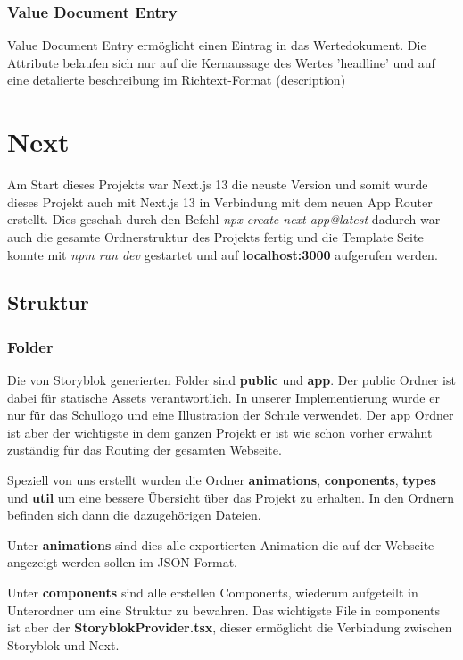 \subsubsection*{Value Document Entry}
Value Document Entry ermöglicht einen Eintrag in das Wertedokument. Die Attribute belaufen sich nur auf die Kernaussage des Wertes 'headline' und auf eine detalierte beschreibung im Richtext-Format (description) 

\section{Next}

Am Start dieses Projekts war Next.js 13 die neuste Version und somit wurde dieses Projekt auch mit Next.js 13 in Verbindung mit dem neuen App Router erstellt.
Dies geschah durch den Befehl \emph{npx create-next-app@latest} dadurch war auch die gesamte Ordnerstruktur des Projekts fertig und die Template Seite konnte mit \emph{npm run dev} gestartet und auf \textbf{localhost:3000} aufgerufen werden.

\subsection{Struktur}
\subsubsection*{Folder}
Die von Storyblok generierten Folder sind \textbf{public} und \textbf{app}. 
Der public Ordner ist dabei für statische Assets verantwortlich. In unserer Implementierung wurde er nur für das Schullogo und eine Illustration der Schule verwendet. 
Der app Ordner ist aber der wichtigste in dem ganzen Projekt er ist wie schon vorher erwähnt zuständig für das Routing der gesamten Webseite. 


Speziell von uns erstellt wurden die Ordner \textbf{animations}, \textbf{conponents}, \textbf{types} und \textbf{util} um eine bessere Übersicht über das Projekt zu erhalten. 
In den Ordnern befinden sich dann die dazugehörigen Dateien.

Unter \textbf{animations} sind dies alle exportierten Animation die auf der Webseite angezeigt werden sollen im JSON-Format. 

Unter \textbf{components} sind alle erstellen Components, wiederum aufgeteilt in Unterordner um eine Struktur zu bewahren. Das wichtigste File in components ist aber der \textbf{StoryblokProvider.tsx}, dieser ermöglicht die Verbindung zwischen Storyblok und Next.

